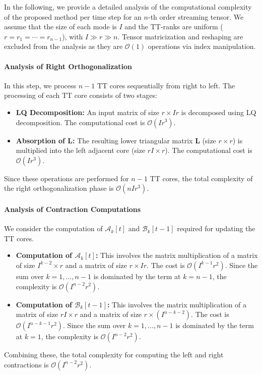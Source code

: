 \documentclass[a4paper, 11pt]{article}
\theoremstyle{plain}
\theoremstyle{definition}
\theoremstyle{remark}
\begin{document}
In the following, we provide a detailed analysis of the computational complexity of the proposed method per time step for an $n$-th order streaming tensor.
We assume that the size of each mode is $I$ and the TT-ranks are uniform ($r = r_1 = \cdots = r_{n-1}$), with $I \gg r \gg n$.
Tensor matricization and reshaping are excluded from the analysis as they are $\mathcal{O}(1)$ operations via index manipulation.

\paragraph{Analysis of Right Orthogonalization}
In this step, we process $n-1$ TT cores sequentially from right to left. The processing of each TT core consists of two stages:
\begin{itemize}
    \item \textbf{LQ Decomposition:} An input matrix of size $r \times Ir$ is decomposed using LQ decomposition. The computational cost is $\mathcal{O}(I r^3)$.
    \item \textbf{Absorption of $\mathbf{L}$:} The resulting lower triangular matrix $\mathbf{L}$ (size $r \times r$) is multiplied into the left adjacent core (size $rI \times r$). The computational cost is $\mathcal{O}(I r^3)$.
\end{itemize}
Since these operations are performed for $n-1$ TT cores, the total complexity of the right orthogonalization phase is $\mathcal{O}(n I r^3)$.

\paragraph{Analysis of Contraction Computations}
We consider the computation of $\mathcal{A}_k[t]$ and $\mathcal{B}_k[t-1]$ required for updating the TT cores.
\begin{itemize}
    \item \textbf{Computation of $\mathcal{A}_k[t]$:} This involves the matrix multiplication of a matrix of size $I^{k-2} \times r$ and a matrix of size $r \times Ir$. The cost is $\mathcal{O}(I^{k-1} r^2)$. Since the sum over $k=1, \ldots, n-1$ is dominated by the term at $k=n-1$, the complexity is $\mathcal{O}(I^{n-2} r^2)$.
    \item \textbf{Computation of $\mathcal{B}_k[t-1]$:} This involves the matrix multiplication of a matrix of size $rI \times r$ and a matrix of size $r \times (I^{n-k-2})$. The cost is $\mathcal{O}(I^{n-k-1} r^2)$. Since the sum over $k=1, \ldots, n-1$ is dominated by the term at $k=1$, the complexity is $\mathcal{O}(I^{n-2} r^2)$.
\end{itemize}
Combining these, the total complexity for computing the left and right contractions is $\mathcal{O}(I^{n-2} r^2)$.
\end{document}
